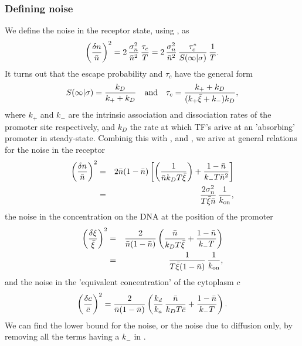 \subsubsection{Defining noise}
We define the noise in the receptor state, using , as
\begin{equation}
 \left( \frac{\delta n}{\bar{n}} \right)^2 = 2 \, \frac{\sigma_n^2}{\bar{n}^2} \, \frac{\tau_c}{T} = 2 \, \frac{\sigma_n^2}{\bar{n}^2} \, \frac{\tau_c^*}{S(\infty|\sigma)} \, \frac{1}{T}.
 \elabel{EqProNoise}
\end{equation}
It turns out that the escape probability and $\tau_c$ have the general form
\begin{equation}
 S(\infty|\sigma) = \frac{k_D}{k_+ + k_D} \quad {\rm and} \quad \tau_c = \frac{k_+ + k_D}{(k_+ \bar{\xi} + k_-) k_D},
 \elabel{Sinfty}
\end{equation}
where $k_+$ and $k_-$ are the intrinsic association and dissociation rates of the promoter site respectively, and $k_D$ the rate at which TF's arive at an 'absorbing' promoter in steady-state. Combinig this with ,  and , we arive at general relations for the noise in the receptor
\begin{eqnarray}
 \elabel{NoisePro}
 \left( \frac{\delta n}{\bar{n}} \right)^2 & = & 2 \bar{n}(1-\bar{n})\left[\left( \frac{1}{\bar{n} k_D T \bar{\xi}} \right)+\frac{1-\bar{n}}{k_- T \bar{n}^2} \right] \\
 & = & \frac{2 \sigma_n^2}{T \bar{\xi} \bar{n}} \, \frac{1}{k_{\rm on}},
\end{eqnarray}
the noise in the concentration on the DNA at the position of the promoter
\begin{eqnarray}
 \elabel{NoiseXi}
 \left( \frac{\delta \xi}{\bar{\xi}} \right)^2 & = & \frac{2}{\bar{n}(1-\bar{n})} \left( \frac{\bar{n}}{k_D T \bar{\xi}} + \frac{1-\bar{n}}{k_- T}  \right) \\
  & = & \frac{1}{T \bar{\xi} (1 - \bar{n})} \, \frac{1}{k_{\rm on}},
\end{eqnarray}
and the noise in the 'equivalent concentration' of the cytoplasm $c$
\begin{equation}
 \elabel{NoiseC} 
 \left( \frac{\delta c}{\bar{c}} \right)^2 = \frac{2}{\bar{n}(1-\bar{n})} \left( \frac{k_d}{k_a} \, \frac{\bar{n}}{k_D T \bar{c}} + \frac{1-\bar{n}}{k_- T}  \right).
\end{equation}
We can find the lower bound for the noise, or the noise due to diffusion only, by removing all the terms having a $k_-$ in . 

